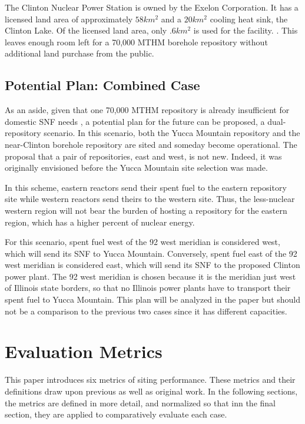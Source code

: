 The Clinton Nuclear Power Station is owned by the Exelon Corporation. It has a 
licensed land area of approximately $58km^2$ and a $20km^2$ cooling heat sink, 
the Clinton Lake. Of the licensed land area, only $.6km^2$ is used for the facility.  
\cite{nrc_chapter_2007}.  This leaves enough room left for a 70,000 \gls{MTHM} 
borehole repository without additional land purchase from the public.

\subsection{Potential Plan: Combined Case}
As an aside, given that one 70,000 \gls{MTHM} repository is already insufficient for 
domestic \gls{SNF} needs \cite{doe_report_2008}, a potential plan for the future can be proposed, 
a dual-repository scenario. In this scenario, both the Yucca Mountain 
repository and the near-Clinton borehole repository are sited and someday 
become operational. The proposal that a pair of repositories, east and west, is 
not new. Indeed, it was originally envisioned before the Yucca Mountain site 
selection was made.

In this scheme, eastern reactors send their spent fuel to the eastern 
repository site while western reactors send theirs to the western site. Thus, 
the less-nuclear western region will not bear the burden of hosting a 
repository for the eastern region, which has a higher percent of nuclear 
energy. 

For this scenario, spent fuel west of the 92 west meridian is considered west, 
which will send its \gls{SNF} to Yucca Mountain. Conversely, spent fuel east of the 92 west
meridian is considered east, which will send its \gls{SNF} to the proposed Clinton 
power plant. The 92 west meridian is chosen because it is the meridian just west of
Illinois state borders, so that no Illinois power plants have to transport their
spent fuel to Yucca Mountain. This plan will be analyzed in the paper but should
not be a comparison to the previous two cases since it has different capacities. %



\section{Evaluation Metrics}

This paper introduces six metrics of siting performance. These metrics and 
their definitions draw upon previous 
\cite{freeze_siting_2015,waleed_regional_2015} as well as original work.  In 
the following sections, the metrics are defined in more detail, and normalized
so that inn the final section, they are applied to comparatively evaluate each case.

